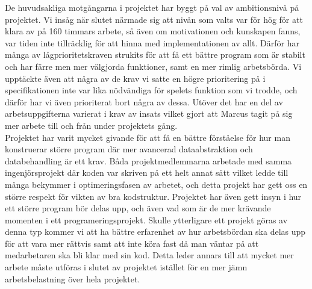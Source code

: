 \documentclass[12pt,a4paper]{article}
\begin{document}
De huvudsakliga motgångarna i projektet har byggt på val av ambitionsnivå på projektet. Vi insåg när slutet närmade sig att nivån som valts var för hög för att klara av på 160 timmars arbete, så även om motivationen och kunskapen fanns, var tiden inte tillräcklig för att hinna med implementationen av allt. Därför har många av lågprioritetskraven strukits för att få ett bättre program som är stabilt och har färre men mer välgjorda funktioner, samt en mer rimlig arbetsbörda. Vi upptäckte även att några av de krav vi satte en högre prioritering på i specifikationen inte var lika nödvändiga för spelets funktion som vi trodde, och därför har vi även prioriterat bort några av dessa. Utöver det har en del av arbetsuppgifterna varierat i krav av insats vilket gjort att Marcus tagit på sig mer arbete till och från under projektets gång. \\

Projektet har varit mycket givande för att få en bättre förståelse för hur man konstruerar större program där mer avancerad dataabstraktion och databehandling är ett krav. Båda projektmedlemmarna arbetade med samma ingenjörsprojekt där koden var skriven på ett helt annat sätt vilket ledde till många bekymmer i optimeringsfasen av arbetet, och detta projekt har gett oss en större respekt för vikten av bra kodstruktur. Projektet har även gett insyn i hur ett större program bör delas upp, och även vad som är de mer krävande momenten i ett programeringsprojekt. Skulle ytterligare ett projekt göras av denna typ kommer vi att ha bättre erfarenhet av hur arbetsbördan ska delas upp för att vara mer rättvis samt att inte köra fast då man väntar på att medarbetaren ska bli klar med sin kod. Detta leder annars till att mycket mer arbete måste utföras i slutet av projektet istället för en mer jämn arbetsbelastning över hela projektet. \\
\end{document}
